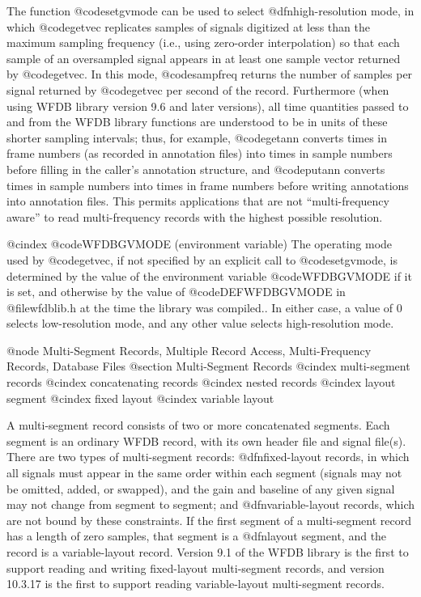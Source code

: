 {{{{{{{{{{{{{{The function @code{setgvmode} can be used to select @dfn{high-resolution} mode,
in which @code{getvec} replicates samples of signals digitized at less than the
maximum sampling frequency (i.e., using zero-order interpolation) so that each
sample of an oversampled signal appears in at least one sample vector returned
by @code{getvec}.  In this mode, @code{sampfreq} returns the number of samples
per signal returned by @code{getvec} per second of the record.  Furthermore
(when using WFDB library version 9.6 and later versions), all time quantities
passed to and from the WFDB library functions are understood to be in units of
these shorter sampling intervals; thus, for example, @code{getann} converts
times in frame numbers (as recorded in annotation files) into times in sample
numbers before filling in the caller's annotation structure, and @code{putann}
converts times in sample numbers into times in frame numbers before writing
annotations into annotation files.  This permits applications that are not
``multi-frequency aware'' to read multi-frequency records with the highest
possible resolution.

@cindex @code{WFDBGVMODE} (environment variable)
The operating mode used by @code{getvec}, if not specified by an explicit call
to @code{setgvmode}, is determined by the value of the environment variable
@code{WFDBGVMODE} if it is set, and otherwise by the value of
@code{DEFWFDBGVMODE} in @file{wfdblib.h} at the time the library was compiled..
In either case, a value of 0 selects low-resolution mode, and any other value
selects high-resolution mode.

@node     Multi-Segment Records, Multiple Record Access, Multi-Frequency Records, Database Files
@section Multi-Segment Records
@cindex multi-segment records
@cindex concatenating records
@cindex nested records
@cindex layout segment
@cindex fixed layout
@cindex variable layout

A multi-segment record consists of two or more concatenated segments.
Each segment is an ordinary WFDB record, with its own header file and
signal file(s).  There are two types of multi-segment records:
@dfn{fixed-layout} records, in which all signals must appear in the
same order within each segment (signals may not be omitted, added, or
swapped), and the gain and baseline of any given signal may not change
from segment to segment; and @dfn{variable-layout} records, which are
not bound by these constraints.  If the first segment of a
multi-segment record has a length of zero samples, that segment is a
@dfn{layout segment}, and the record is a variable-layout record.
Version 9.1 of the WFDB library is the first to support reading and
writing fixed-layout multi-segment records, and version 10.3.17 is the
first to support reading variable-layout multi-segment records.

}}}}}}}}}}}}}}
